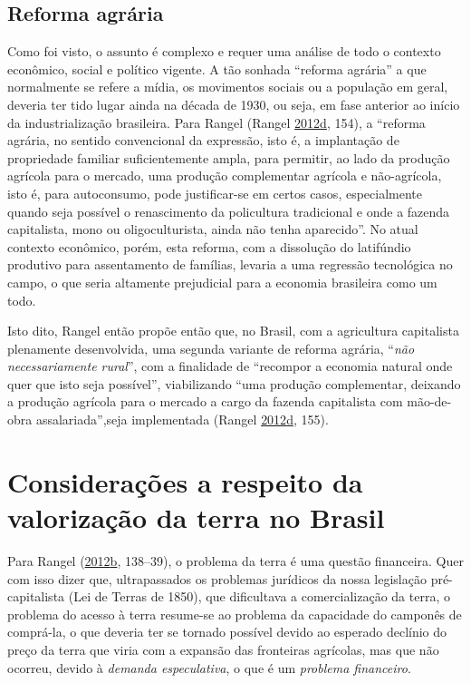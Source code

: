 \documentclass[
	12pt,				%
	oneside,			%
	a4paper,			%
	chapter=TITLE,		%
	section=TITLE,		%
	english,			%
	brazil				%
	]{abntex2}
\begin{document}
\hypertarget{reforma-agruxe1ria}{%
\subsection{Reforma agrária}\label{reforma-agruxe1ria}}

Como foi visto, o assunto é complexo e requer uma análise de todo o contexto
econômico, social e político vigente. A tão sonhada ``reforma agrária'' a que
normalmente se refere a mídia, os movimentos sociais ou a população em geral,
deveria ter tido lugar ainda na década de 1930, ou seja, em fase anterior ao
início da industrialização brasileira. Para Rangel (Rangel \protect\hyperlink{ref-rangel1986a}{2012}\protect\hyperlink{ref-rangel1986a}{d}, 154), a
``reforma agrária, no sentido convencional da expressão, isto é, a implantação de
propriedade familiar suficientemente ampla, para permitir, ao lado da produção
agrícola para o mercado, uma produção complementar agrícola e não-agrícola, isto
é, para autoconsumo, pode justificar-se em certos casos, especialmente quando
seja possível o renascimento da policultura tradicional e onde a fazenda
capitalista, mono ou oligoculturista, ainda não tenha aparecido''. No atual
contexto econômico, porém, esta reforma, com a dissolução do latifúndio
produtivo para assentamento de famílias, levaria a uma regressão tecnológica no
campo, o que seria altamente prejudicial para a economia brasileira como um
todo.

Isto dito, Rangel então propõe então que, no Brasil, com a agricultura
capitalista plenamente desenvolvida, uma segunda variante de reforma agrária,
``\emph{não necessariamente rural}'', com a finalidade de ``recompor a economia natural
onde quer que isto seja possível'', viabilizando ``uma produção complementar,
deixando a produção agrícola para o mercado a cargo da fazenda capitalista com
mão-de-obra assalariada'',seja implementada (Rangel \protect\hyperlink{ref-rangel1986a}{2012}\protect\hyperlink{ref-rangel1986a}{d}, 155).

\hypertarget{considerauxe7uxf5es-a-respeito-da-valorizauxe7uxe3o-da-terra-no-brasil}{%
\section{Considerações a respeito da valorização da terra no Brasil}\label{considerauxe7uxf5es-a-respeito-da-valorizauxe7uxe3o-da-terra-no-brasil}}

Para Rangel (\protect\hyperlink{ref-rangel1986b}{2012}\protect\hyperlink{ref-rangel1986b}{b}, 138--39), o problema da terra é uma questão
financeira. Quer com isso dizer que, ultrapassados os problemas jurídicos da
nossa legislação pré-capitalista (Lei de Terras de 1850), que dificultava a
comercialização da terra, o problema do acesso à terra resume-se ao problema da
capacidade do camponês de comprá-la, o que deveria ter se tornado possível
devido ao esperado declínio do preço da terra que viria com a expansão das
fronteiras agrícolas, mas que não ocorreu, devido à \emph{demanda especulativa}, o
que é um \emph{problema financeiro}.
\end{document}

